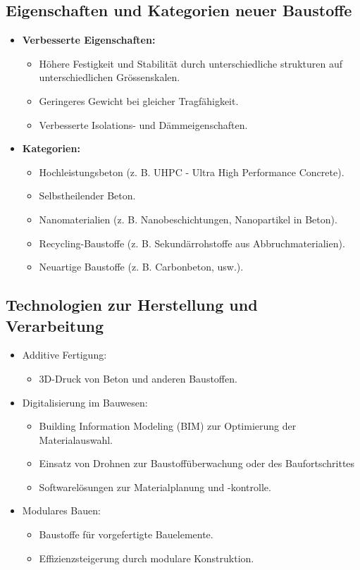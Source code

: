 \documentclass[
11pt,
captions=tableheading,
smallheadings,
headsepline,
footsepline, 
captions=tableheading,
parskip=half-,
]{scrartcl}
\begin{document}
\subsection{Eigenschaften und Kategorien neuer Baustoffe}
\begin{itemize}
    \item \textbf{Verbesserte Eigenschaften:}
    \begin{itemize}
        \item Höhere Festigkeit und Stabilität durch unterschiedliche strukturen auf unterschiedlichen Grössenskalen.
        \item Geringeres Gewicht bei gleicher Tragfähigkeit.
        \item Verbesserte Isolations- und Dämmeigenschaften.
    \end{itemize}
    \item \textbf{Kategorien:}
    \begin{itemize}
        \item Hochleistungsbeton (z. B. UHPC - Ultra High Performance Concrete).
        \item Selbstheilender Beton.
        \item Nanomaterialien (z. B. Nanobeschichtungen, Nanopartikel in Beton).
        \item Recycling-Baustoffe (z. B. Sekundärrohstoffe aus Abbruchmaterialien).
        \item Neuartige Baustoffe (z. B. Carbonbeton, usw.).
    \end{itemize}
\end{itemize}

\subsection{Technologien zur Herstellung und Verarbeitung}
\begin{itemize}
    \item Additive Fertigung:
    \begin{itemize}
        \item 3D-Druck von Beton und anderen Baustoffen.
    \end{itemize}
    \item Digitalisierung im Bauwesen:
    \begin{itemize}
        \item Building Information Modeling (BIM) zur Optimierung der Materialauswahl.
        \item Einsatz von Drohnen zur Baustoffüberwachung oder des Baufortschrittes
        \item Softwarelösungen zur Materialplanung und -kontrolle.
    \end{itemize}
    \item Modulares Bauen:
    \begin{itemize}
        \item Baustoffe für vorgefertigte Bauelemente.
        \item Effizienzsteigerung durch modulare Konstruktion.
    \end{itemize}
\end{itemize}
\end{document}
